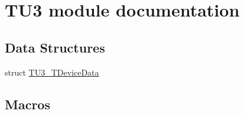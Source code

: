 \hypertarget{group___t_u3__module}{\section{T\-U3 module documentation}
\label{group___t_u3__module}
}
\subsection*{Data Structures}
\begin{DoxyCompactItemize}
\item 
struct \hyperlink{struct_t_u3___t_device_data}{T\-U3\-\_\-\-T\-Device\-Data}
\end{DoxyCompactItemize}
\subsection*{Macros}

